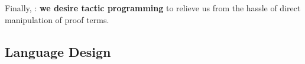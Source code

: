 Finally, : \textbf{we desire tactic
programming} to relieve us from the hassle of direct manipulation of
proof terms.

\subsection{Language Design}

